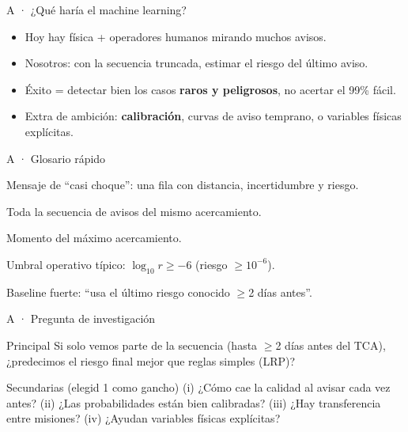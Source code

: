 \documentclass[aspectratio=169,10pt]{beamer}
\begin{document}
\begin{frame}{A · ¿Qué haría el machine learning?}
  \begin{itemize}
    \item Hoy hay física + operadores humanos mirando muchos avisos.
    \item Nosotros: con la secuencia truncada, estimar el riesgo del último aviso.
    \item Éxito = detectar bien los casos \textbf{raros y peligrosos}, no acertar el 99\% fácil.
    \item Extra de ambición: \textbf{calibración}, curvas de aviso temprano, o variables físicas explícitas.
  \end{itemize}
\end{frame}

\begin{frame}{A · Glosario rápido}
  \begin{description}[style=nextline,leftmargin=1.4cm,font=\bfseries\scriptsize]
    \item[CDM] Mensaje de ``casi choque'': una fila con distancia, incertidumbre y riesgo.
    \item[Evento] Toda la secuencia de avisos del mismo acercamiento.
    \item[TCA] Momento del máximo acercamiento.
    \item[High-risk] Umbral operativo típico: $\log_{10} r \geq -6$ (riesgo $\geq 10^{-6}$).
    \item[LRP] Baseline fuerte: ``usa el último riesgo conocido $\geq$2 días antes''.
  \end{description}
\end{frame}

\begin{frame}{A · Pregunta de investigación}
  \begin{block}{Principal}
    Si solo vemos parte de la secuencia (hasta $\geq$2 días antes del TCA), ¿predecimos el riesgo final mejor que reglas simples (LRP)?
  \end{block}
  \begin{block}{Secundarias (elegid 1 como gancho)}
    \scriptsize
    (i) ¿Cómo cae la calidad al avisar cada vez antes? \quad
    (ii) ¿Las probabilidades están bien calibradas? \quad
    (iii) ¿Hay transferencia entre misiones? \quad
    (iv) ¿Ayudan variables físicas explícitas?
  \end{block}
\end{frame}
\end{document}
